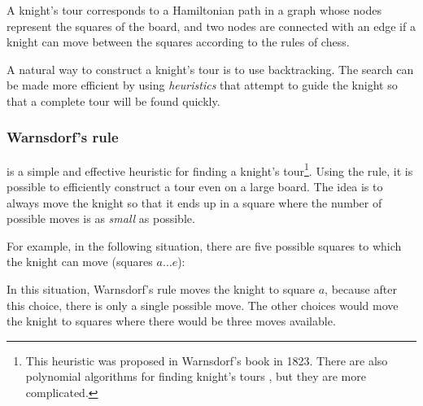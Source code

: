 A knight's tour corresponds to a Hamiltonian path in a graph
whose nodes represent the squares of the board,
and two nodes are connected with an edge if a knight
can move between the squares according to the rules of chess.

A natural way to construct a knight's tour is to use backtracking.
The search can be made more efficient by using
\emph{heuristics} that attempt to guide the knight so that
a complete tour will be found quickly.

\subsubsection{Warnsdorf's rule}


 is a simple and effective heuristic
for finding a knight's tour\footnote{This heuristic was proposed
in Warnsdorf's book \cite{war23} in 1823. There are
also polynomial algorithms for finding knight's tours
\cite{par97}, but they are more complicated.}.
Using the rule, it is possible to efficiently construct a tour
even on a large board.
The idea is to always move the knight so that it ends up
in a square where the number of possible moves is as
\emph{small} as possible.

For example, in the following situation, there are five
possible squares to which the knight can move (squares $a \ldots e$):
\begin{center}
\end{center}
In this situation, Warnsdorf's rule moves the knight to square $a$,
because after this choice, there is only a single possible move.
The other choices would move the knight to squares where
there would be three moves available.


